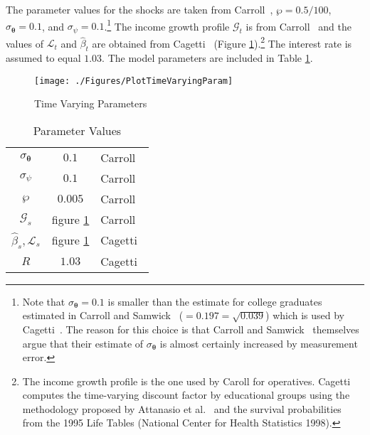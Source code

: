 \documentclass[titlepage, headings=optiontotocandhead]{Resources/texmf-local/tex/latex/econtex}
\begin{document}
The parameter values for the shocks are taken from Carroll~\citeyearpar{carroll:brookings}, $\wp=0.5/100$, $\sigma _{\pmb{\theta} }=0.1$, and $\sigma_{\psi}=0.1$.\footnote{Note that $\sigma _{\pmb{\theta}}=0.1$ is smaller than the estimate for college graduates estimated in
  Carroll and Samwick~\citeyearpar{carroll&samwick:nature} ($=0.197=\sqrt{0.039}$) which is used by Cagetti~\citeyearpar{cagettiWprofiles}. The reason for this choice is that Carroll and Samwick~\citeyearpar{carroll&samwick:nature} themselves argue that their estimate of $\sigma_{\pmb{\theta} }$ is almost certainly increased by measurement error.} The income growth profile $\mathcal{G}_{t}$ is from Carroll~\citeyearpar{carrollBSLCPIH} and the values of $\mathcal{L}_{t}$ and $\hat{\beta}_{t}$ are obtained from Cagetti~\citeyearpar{cagettiWprofiles} (Figure \ref{fig:TimeVaryingParam}).\footnote{The income growth profile is the one used by Caroll for operatives. Cagetti computes the time-varying discount factor by educational groups using the methodology proposed by Attanasio et al.~\citeyearpar{AttanasioBanksMeghirWeber} and the survival probabilities from the 1995 Life Tables (National Center for Health Statistics 1998).} The interest rate is assumed to equal $1.03$. The model parameters are included in Table \ref{table:StrEstParams}.

\hypertarget{PlotTimeVaryingParam}{}
\begin{figure}[h]
  \texttt{[image: ./Figures/PlotTimeVaryingParam]}
  \caption{Time Varying Parameters}
  \label{fig:TimeVaryingParam}
\end{figure}

\begin{table}[h]
  \caption{Parameter Values}\label{table:StrEstParams}
  \begin{center}
    \begin{tabular}{ccl}
      \hline\hline
      $\sigma _{\pmb{\theta}}$    & $0.1$ & Carroll~\citeyearpar{carroll:brookings}
      \\ $\sigma _{\psi}$   & $0.1$ & Carroll~\citeyearpar{carroll:brookings}
      \\ $\wp$           & $0.005$  & Carroll~\citeyearpar{carroll:brookings}
      \\ $\mathcal{G}_{s}$        & figure \ref{fig:TimeVaryingParam} & Carroll~\citeyearpar{carrollBSLCPIH}
      \\ $\hat{\beta}_{s},\mathcal{L}_{s}$ & figure \ref{fig:TimeVaryingParam} & Cagetti~\citeyearpar{cagettiWprofiles}
      \\$R$            & $1.03$  & Cagetti~\citeyearpar{cagettiWprofiles}\\
      \hline
    \end{tabular}
  \end{center}
\end{table}
\end{document}

